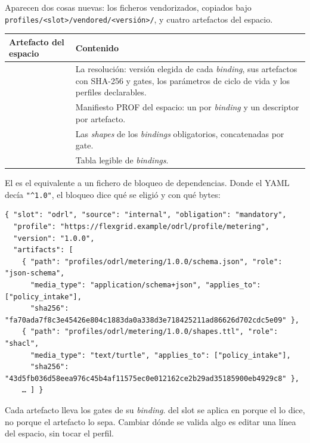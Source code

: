 Aparecen dos cosas nuevas: los ficheros vendorizados, copiados bajo \texttt{profiles/\allowbreak{}<slot>/\allowbreak{}vendored/\allowbreak{}<versión>/\allowbreak{}}, y
cuatro artefactos del espacio.

\noindent\begin{tabularx}{\linewidth}{@{}L{4.8cm}Y@{}}
\toprule
\textbf{Artefacto del espacio} & \textbf{Contenido} \\
\midrule
{} & La resolución: versión elegida de cada \emph{binding}, sus artefactos con SHA-256 y gates, los parámetros de ciclo de vida y los perfiles declarables. \\
 & Manifiesto PROF del espacio: un  por \emph{binding} y un descriptor por artefacto. \\
 & Las \emph{shapes} de los \emph{bindings} obligatorios, concatenadas por gate. \\
 & Tabla legible de \emph{bindings}. \\
\bottomrule
\end{tabularx}

\medskip
El  es el equivalente a un fichero de bloqueo de dependencias. Donde el YAML decía
\texttt{"\textasciicircum{}1.0"}, el bloqueo dice qué se eligió y con qué bytes:

\begin{lstlisting}[style=json]
{ "slot": "odrl", "source": "internal", "obligation": "mandatory",
  "profile": "https://flexgrid.example/odrl/profile/metering",
  "version": "1.0.0",
  "artifacts": [
    { "path": "profiles/odrl/metering/1.0.0/schema.json", "role": "json-schema",
      "media_type": "application/schema+json", "applies_to": ["policy_intake"],
      "sha256": "fa70ada7f8c3e45426e804c1883da0a338d3e718425211ad86626d702cdc5e09" },
    { "path": "profiles/odrl/metering/1.0.0/shapes.ttl", "role": "shacl",
      "media_type": "text/turtle", "applies_to": ["policy_intake"],
      "sha256": "43d5fb036d58eea976c45b4af11575ec0e012162ce2b29ad35185900eb4929c8" },
    … ] }
\end{lstlisting}

\begin{ideaClave}
Cada artefacto lleva los gates de su \emph{binding}.  del slot  se aplica en
 porque el  lo dice, no porque el artefacto lo sepa. Cambiar dónde se valida
algo es editar una línea del espacio, sin tocar el perfil.
\end{ideaClave}

